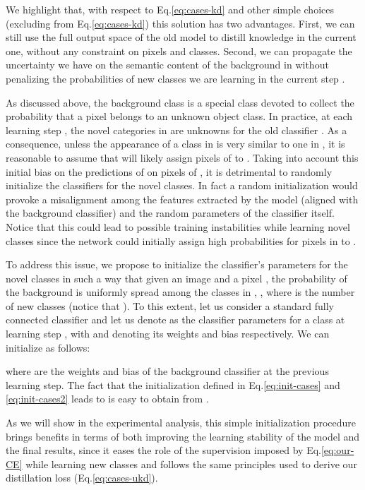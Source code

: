 We highlight that, with respect to Eq.\eqref{eq:cases-kd} and other simple choices (\eg excluding  from Eq.\eqref{eq:cases-kd}) this solution has two advantages. First, we can still use the full output space of the old model to distill knowledge in the current one, without any constraint on pixels and classes. Second, we can propagate the uncertainty we have on the semantic content of the background in  without penalizing the probabilities of new classes we are learning in the current step . 




 As discussed above, the background class  is a special class devoted to collect the probability that a pixel belongs to an unknown object class. In practice, at each learning step , the novel categories in  are unknowns for the old classifier . As a consequence, unless the appearance of a class in  is very similar to one in , it is reasonable to assume that  will likely assign pixels of  to . Taking into account this initial bias on the predictions of  on pixels of , it is detrimental to randomly initialize the classifiers for the novel classes. In fact a random initialization would provoke a misalignment among the features extracted by the model (aligned with the background classifier) and the random parameters of the classifier itself. Notice that this could lead to possible training instabilities while learning novel classes since the network could initially assign high probabilities for pixels in  to . 



To address this issue, we propose to initialize the classifier's parameters for the novel classes in such a way that given an image  and a pixel , the probability of the background  is uniformly spread among the classes in , \ie , where  is the number of new classes (notice that ). 
To this extent, let us consider a standard fully connected classifier and let us denote as  the classifier parameters for a class  at learning step , with  and  denoting its weights and bias respectively. We can initialize  as follows:

where  are the weights and bias of the background classifier at the previous learning step. The fact that the initialization defined in Eq.\eqref{eq:init-cases} and \eqref{eq:init-cases2} leads to  is easy to obtain from . 

As we will show in the experimental analysis, this simple initialization procedure brings benefits in terms of both improving the learning stability of the model and the final results, since it eases the role of the supervision imposed by Eq.\eqref{eq:our-CE} while learning new classes and follows the same principles used to derive our distillation loss (Eq.\eqref{eq:cases-ukd}).





